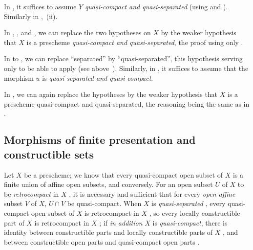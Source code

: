\begin{env}[1.7.19]
\label{IV.1.7.19}
In , it suffices to assume $Y$ \emph{quasi-compact and quasi-separated} (using  and ).
Similarly in ,~(ii).
\end{env}

\begin{env}[1.7.20]
\label{IV.1.7.20}
In , , and , we can replace the two hypotheses on $X$ by the weaker hypothesis that $X$ is a prescheme \emph{quasi-compact and quasi-separated}, the proof using only .
\end{env}

\begin{env}[1.7.21]
\label{IV.1.7.21}
In  to , we can replace ``separated'' by ``quasi-separated'', this hypothesis serving only to be able to apply  (see above~).
Similarly, in , it suffices to assume that the morphism $u$ is \emph{quasi-separated and quasi-compact}.
\end{env}

\begin{env}[1.7.22]
\label{IV.1.7.22}
In , we can again replace the hypotheses by the weaker hypothesis that $X$ is a prescheme quasi-compact and quasi-separated, the reasoning being the same as in .
\end{env}

\subsection{Morphisms of finite presentation and constructible sets}
\label{subsection:IV.1.8}


\begin{env}[1.8.1]
\label{IV.1.8.1}
Let $X$ be a prescheme; we know that every quasi-compact open subset of $X$ is a finite union of affine open subsets, and conversely.
For an open subset $U$ of $X$ to be \emph{retrocompact} in $X$ , it is necessary and sufficient that for every \emph{open affine} subset $V$ of $X$, $U\cap V$ be quasi-compact.
When $X$ is \emph{quasi-separated} , every quasi-compact open subset of $X$ is retrocompact in $X$ , so every locally constructible part of $X$ is retrocompact in $X$ ; if \emph{in addition} $X$ is \emph{quasi-compact}, there is identity between constructible parts and locally constructible parts of $X$ , and between constructible open parts and quasi-compact open parts .
\end{env}


